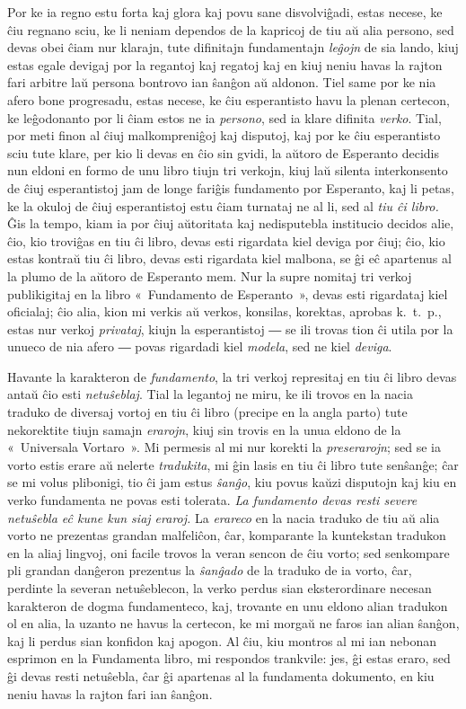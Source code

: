 Por ke ia regno estu forta kaj glora kaj povu sane disvolviĝadi, estas necese, ke ĉiu regnano sciu, ke li neniam dependos de la kapricoj de tiu aŭ alia persono, sed devas obei ĉiam nur klarajn, tute difinitajn fundamentajn \emph{leĝojn} de sia lando, kiuj estas egale devigaj por la regantoj kaj regatoj kaj en kiuj neniu havas la rajton fari arbitre laŭ persona bontrovo ian ŝanĝon aŭ aldonon. Tiel same por ke nia afero bone progresadu, estas necese, ke ĉiu esperantisto havu la plenan certecon, ke leĝodonanto por li ĉiam estos ne ia \emph{persono}, sed ia klare difinita \emph{verko}. Tial, por meti finon al ĉiuj malkompreniĝoj kaj disputoj, kaj por ke ĉiu esperantisto sciu tute klare, per kio li devas en ĉio sin gvidi, la aŭtoro de Esperanto decidis nun eldoni en formo de unu libro tiujn tri verkojn, kiuj laŭ silenta interkonsento de ĉiuj esperantistoj jam de longe fariĝis fundamento por Esperanto, kaj li petas, ke la okuloj de ĉiuj esperantistoj estu ĉiam turnataj ne al li, sed al \emph{tiu ĉi libro.} Ĝis la tempo, kiam ia por ĉiuj aŭtoritata kaj nedisputebla institucio decidos alie, ĉio, kio troviĝas en tiu ĉi libro, devas esti rigardata kiel deviga por ĉiuj; ĉio, kio estas kontraŭ tiu ĉi libro, devas esti rigardata kiel malbona, se ĝi eĉ apartenus al la plumo de la aŭtoro de Esperanto mem. Nur la supre nomitaj tri verkoj publikigitaj en la libro «~Fundamento de Esperanto~», devas esti rigardataj kiel oficialaj; ĉio alia, kion mi verkis aŭ verkos, konsilas, korektas, aprobas k.~t.~p., estas nur verkoj \emph{privataj}, kiujn la esperantistoj ― se ili trovas tion ĉi utila por la unueco de nia afero ― povas rigardadi kiel \emph{modela}, sed ne kiel \emph{deviga}.

Havante la karakteron de \emph{fundamento}, la tri verkoj represitaj en tiu ĉi libro devas antaŭ ĉio esti \emph{netuŝeblaj}. Tial la legantoj ne miru, ke ili trovos en la nacia traduko de diversaj vortoj en tiu ĉi libro (precipe en la angla parto) tute nekorektite tiujn samajn \emph{erarojn}, kiuj sin trovis en la unua eldono de la «~Universala Vortaro~». Mi permesis al mi nur korekti la \emph{preserarojn}; sed se ia vorto estis erare aŭ nelerte \emph{tradukita}, mi ĝin lasis en tiu ĉi libro tute senŝanĝe; ĉar se mi volus plibonigi, tio ĉi jam estus \emph{ŝanĝo}, kiu povus kaŭzi disputojn kaj kiu en verko fundamenta ne povas esti tolerata. \emph{La fundamento devas resti severe netuŝebla eĉ kune kun siaj eraroj.} La \emph{erareco} en la nacia traduko de tiu aŭ alia vorto ne prezentas grandan malfeliĉon, ĉar, komparante la kuntekstan tradukon en la aliaj lingvoj, oni facile trovos la veran sencon de ĉiu vorto; sed senkompare pli grandan danĝeron prezentus la \emph{ŝanĝado} de la traduko de ia vorto, ĉar, perdinte la severan netuŝeblecon, la verko perdus sian eksterordinare necesan karakteron de dogma fundamenteco, kaj, trovante en unu eldono alian tradukon ol en alia, la uzanto ne havus la certecon, ke mi morgaŭ ne faros ian alian ŝanĝon, kaj li perdus sian konfidon kaj apogon. Al ĉiu, kiu montros al mi ian nebonan esprimon en la Fundamenta libro, mi respondos trankvile: jes, ĝi estas eraro, sed ĝi devas resti netuŝebla, ĉar ĝi apartenas al la fundamenta dokumento, en kiu neniu havas la rajton fari ian ŝanĝon.

